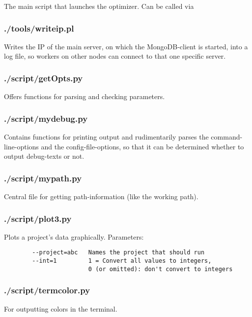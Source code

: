 \documentclass[]{scrartcl}
\begin{document}
The main script that launches the optimizer. Can be called via

\subsubsection{./tools/writeip.pl}

Writes the IP of the main server, on which the MongoDB-client is started, into a log file, so workers on
other nodes can connect to that one specific server.

\subsubsection{./script/getOpts.py}

Offers functions for parsing and checking parameters. \ntbc

\subsubsection{./script/mydebug.py}

Contains functions for printing output and rudimentarily parses the command-line-options and
the config-file-options, so that it can be determined whether to output debug-texts or not. \ntbc

\subsubsection{./script/mypath.py}

Central file for getting path-information (like the working path). \ntbc

\subsubsection{./script/plot3.py}

Plots a project's data graphically. Parameters:

\begin{verbatim}
        --project=abc   Names the project that should run
        --int=1         1 = Convert all values to integers,
                        0 (or omitted): don't convert to integers
\end{verbatim}

\subsubsection{./script/termcolor.py}

For outputting colors in the terminal. \ntbc
\end{document}
